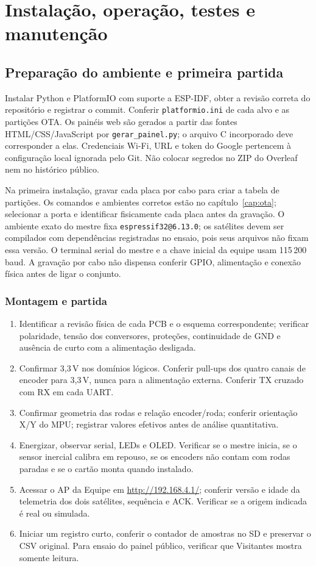 \chapter{Instalação, operação, testes e manutenção}\label{cap:operacao}
\section{Preparação do ambiente e primeira partida}
Instalar Python e PlatformIO com suporte a ESP-IDF, obter a revisão correta do repositório e registrar o commit. Conferir \texttt{platformio.ini} de cada alvo e as partições OTA. Os painéis web são gerados a partir das fontes HTML/CSS/JavaScript por \texttt{gerar\_painel.py}; o arquivo C incorporado deve corresponder a elas. Credenciais Wi-Fi, URL e token do Google pertencem à configuração local ignorada pelo Git. Não colocar segredos no ZIP do Overleaf nem no histórico público.

Na primeira instalação, gravar cada placa por cabo para criar a tabela de partições. Os comandos e ambientes corretos estão no capítulo~\ref{cap:ota}; selecionar a porta e identificar fisicamente cada placa antes da gravação.
O ambiente exato do mestre fixa \texttt{espressif32@6.13.0}; os satélites devem ser compilados com dependências registradas no ensaio, pois seus arquivos não fixam essa versão. O terminal serial do mestre e a chave inicial da equipe usam 115\,200 baud. A gravação por cabo não dispensa conferir GPIO, alimentação e conexão física antes de ligar o conjunto.

\subsection{Montagem e partida}
\begin{enumerate}
\item Identificar a revisão física de cada PCB e o esquema correspondente; verificar polaridade, tensão dos conversores, proteções, continuidade de GND e ausência de curto com a alimentação desligada.
\item Confirmar 3,3\,V nos domínios lógicos. Conferir pull-ups dos quatro canais de encoder para 3,3\,V, nunca para a alimentação externa. Conferir TX cruzado com RX em cada UART.
\item Confirmar geometria das rodas e relação encoder/roda; conferir orientação X/Y do MPU; registrar valores efetivos antes de análise quantitativa.
\item Energizar, observar serial, LEDs e OLED. Verificar se o mestre inicia, se o sensor inercial calibra em repouso, se os encoders não contam com rodas paradas e se o cartão monta quando instalado.
\item Acessar o AP da Equipe em \url{http://192.168.4.1/}; conferir versão e idade da telemetria dos dois satélites, sequência e ACK. Verificar se a origem indicada é real ou simulada.
\item Iniciar um registro curto, conferir o contador de amostras no SD e preservar o CSV original. Para ensaio do painel público, verificar que Visitantes mostra somente leitura.
\end{enumerate}


